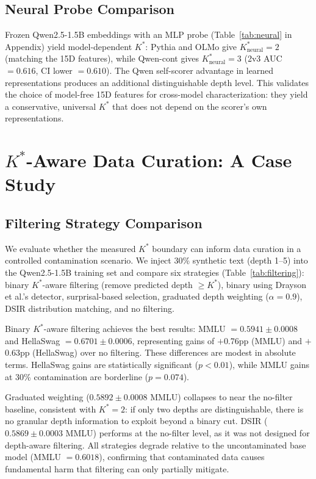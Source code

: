 \documentclass[11pt]{article}
\begin{document}
\subsection{Neural Probe Comparison}

Frozen Qwen2.5-1.5B embeddings with an MLP probe (Table~\ref{tab:neural} in Appendix) yield model-dependent $K^*$: Pythia and OLMo give $K^*_{\text{neural}} = 2$ (matching the 15D features), while Qwen-cont gives $K^*_{\text{neural}} = 3$ (2v3 AUC $= 0.616$, CI lower $= 0.610$). The Qwen self-scorer advantage in learned representations produces an additional distinguishable depth level. This validates the choice of model-free 15D features for cross-model characterization: they yield a conservative, universal $K^*$ that does not depend on the scorer's own representations.

\section{$K^*$-Aware Data Curation: A Case Study}
\label{sec:curation}

\subsection{Filtering Strategy Comparison}

We evaluate whether the measured $K^*$ boundary can inform data curation in a controlled contamination scenario. We inject 30\% synthetic text (depth 1--5) into the Qwen2.5-1.5B training set and compare six strategies (Table~\ref{tab:filtering}): binary $K^*$-aware filtering (remove predicted depth $\geq K^*$), binary using Drayson et al.'s detector, surprisal-based selection, graduated depth weighting ($\alpha = 0.9$), DSIR distribution matching, and no filtering.

Binary $K^*$-aware filtering achieves the best results: MMLU $= 0.5941 \pm 0.0008$ and HellaSwag $= 0.6701 \pm 0.0006$, representing gains of $+$0.76pp (MMLU) and $+$0.63pp (HellaSwag) over no filtering. These differences are modest in absolute terms. HellaSwag gains are statistically significant ($p < 0.01$), while MMLU gains at 30\% contamination are borderline ($p = 0.074$).

Graduated weighting ($0.5892 \pm 0.0008$ MMLU) collapses to near the no-filter baseline, consistent with $K^* = 2$: if only two depths are distinguishable, there is no granular depth information to exploit beyond a binary cut. DSIR ($0.5869 \pm 0.0003$ MMLU) performs at the no-filter level, as it was not designed for depth-aware filtering. All strategies degrade relative to the uncontaminated base model (MMLU $= 0.6018$), confirming that contaminated data causes fundamental harm that filtering can only partially mitigate.
\end{document}
